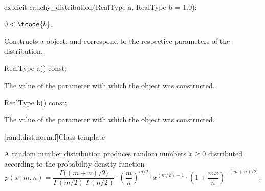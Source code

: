 %
\begin{itemdecl}
explicit cauchy_distribution(RealType a, RealType b = 1.0);
\end{itemdecl}

\begin{itemdescr}
\pnum
\requires $0 < \tcode{b}$.

\pnum
\effects Constructs a  object;
 and 
correspond to the respective parameters of the distribution.
\end{itemdescr}

%
\begin{itemdecl}
RealType a() const;
\end{itemdecl}

\begin{itemdescr}
\pnum\returns The value of the  parameter
 with which the object was constructed.
\end{itemdescr}

%
\begin{itemdecl}
RealType b() const;
\end{itemdecl}

\begin{itemdescr}
\pnum\returns The value of the  parameter
 with which the object was constructed.
\end{itemdescr}


[rand.dist.norm.f]{Class template }%
%
%

\pnum
A  random number distribution
produces random numbers $x \ge 0$
distributed according to
the probability density function%
%
%
\[ p(x\,|\,m,n) = \frac{\Gamma\big((m+n)/2\big)}{\Gamma(m/2) \; \Gamma(n/2)}
     \cdot \left(\frac{m}{n}\right)^{m/2}
     \cdot x^{(m/2)-1}
     \cdot \left(1 + \frac{m x}{n}\right)^{-(m + n)/2}
     \text{ .} \]

